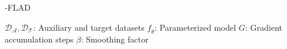 \begin{algorithm}[t]
\caption{\ucb{}-FLAD}
\label{alg:ucb1}
\small
\begin{algorithmic}[1]




    









            




\REQUIRE $\mathcal{D}_{\mathcal{A}},\mathcal{D}_{\mathcal{T}}$: Auxiliary and target datasets
\REQUIRE $\mathit{f}_{\theta}$: Parameterized model
\REQUIRE $G$: Gradient accumulation steps
\REQUIRE $\beta$: Smoothing factor


\end{algorithmic}
\end{algorithm}
